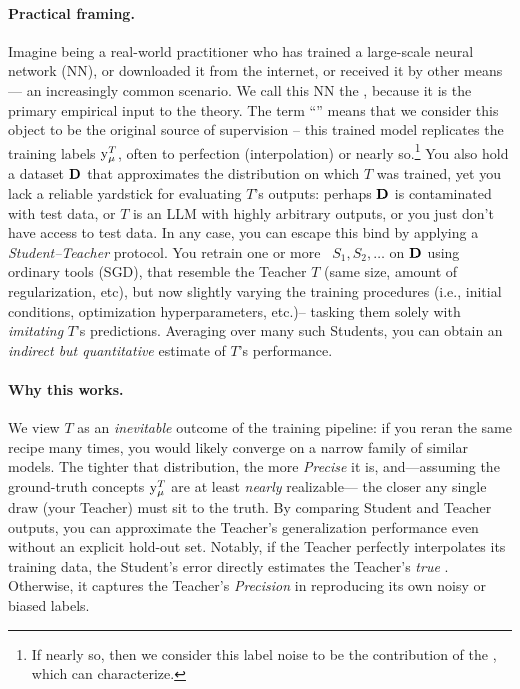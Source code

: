 \paragraph{Practical framing.}
Imagine being a real-world practitioner who has trained a large-scale neural network (NN), or downloaded it from the internet, or received it by other means --- an increasingly common scenario.
 We call this NN the \Teacher, because it is the primary empirical input to the theory. The term ``\Teacher'' means that we consider this object to be the original source of supervision -- this trained model replicates the training labels $\mathrm{y}_{\mu}^{T}$, often to perfection (interpolation) or nearly so.\footnote{If nearly so, then we consider this label noise to be the contribution of the \Teacher, which \SETOL can characterize.}
You also hold a dataset $\mathbf{D}$ that approximates the distribution on which $T$ was trained, yet you lack a reliable yardstick for evaluating $T$’s outputs: perhaps $\mathbf{D}$ is contaminated with test data, or $T$ is an LLM with highly arbitrary outputs, or you just
don't have access to test data.  In any case, you can escape this bind by applying a \emph{Student–Teacher} protocol.  
You retrain one or more \Students\ $S_{1},S_{2},\dots$ on $\mathbf{D}$ using ordinary tools (SGD), that resemble the Teacher $T$
(same size, amount of regularization, etc),
but now slightly varying the training procedures (i.e., initial conditions, optimization hyperparameters, etc.)--
tasking them solely with \emph{imitating} $T$’s predictions. 
Averaging over many such Students, you can obtain an \emph{indirect but quantitative} estimate of $T$’s performance.

\paragraph{Why this works.}  
We view $T$ as an \textit{inevitable} outcome of the training pipeline: if you reran the same recipe many times, you would likely converge on a narrow family of similar models.  
The tighter that distribution, the more \emph{Precise} it is, and—assuming the ground-truth concepts $\mathrm{y}_{\mu}^{T}$
are at least \emph{nearly} realizable— the closer any single draw (your Teacher) must sit to the truth.  
By comparing Student and Teacher outputs, you can approximate the Teacher’s generalization performance even without an explicit hold-out set.  
Notably, if the Teacher perfectly interpolates its training data, the Student’s error directly estimates the Teacher’s \emph{true} \GeneralizationAccuracy.
Otherwise, it captures the Teacher’s \emph{Precision} in reproducing its own noisy or biased labels.

